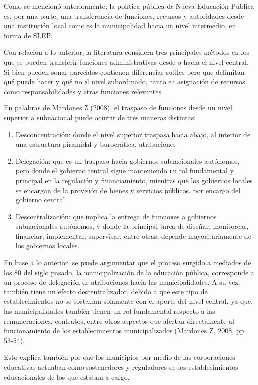 \documentclass[
  12pt,
  letterpaper,
]{article}
\begin{document}
Como se mencionó anteriormente, la política pública de Nueva Educación Pública es, por una parte, una transferencia de funciones, recursos y autoridades desde una institución local como es la municipalidad hacia un nivel intermedio, en forma de SLEP.

Con relación a lo anterior, la literatura considera tres principales métodos en los que se pueden transferir funciones administrativas desde o hacia el nivel central.
Si bien pueden sonar parecidos contienen diferencias sutiles pero que delimitan qué puede hacer y qué no el nivel subordinado, tanto en asignación de recursos como responsabilidades y otras funciones relevantes.

En palabras de Mardones Z (2008), el traspaso de funciones desde un nivel superior a subnacional puede ocurrir de tres maneras distintas:

\begin{enumerate}
\def\labelenumi{\arabic{enumi}.}
\item
  Desconcentración: donde el nivel superior traspasa hacia abajo, al interior de una estructura piramidal y burocrática, atribuciones
\item
  Delegación: que es un traspaso hacia gobiernos subnacionales autónomos, pero donde el gobierno central sigue manteniendo un rol fundamental y principal en la regulación y financiamiento, mientras que los gobiernos locales se encargan de la provisión de bienes y servicios públicos, por encargo del gobierno central
\item
  Descentralización: que implica la entrega de funciones a gobiernos subnacionales autónomos, y donde la principal tarea de diseñar, monitorear, financiar, implementar, supervisar, entre otras, depende mayoritariamente de los gobiernos locales.
\end{enumerate}

En base a lo anterior, se puede argumentar que el proceso surgido a mediados de los 80 del siglo pasado, la municipalización de la educación pública, corresponde a un proceso de delegación de atribuciones hacia las municipalidades.
A su vez, también tiene un efecto descentralizador, debido a que este tipo de establecimientos no se sostenían solamente con el aporte del nivel central, ya que, las municipalidades también tienen un rol fundamental respecto a las remuneraciones, contratos, entre otros aspectos que afectan directamente al funcionamiento de los establecimientos municipalizados (Mardones Z, 2008, pp. 53-54).

Esto explica también por qué los municipios por medio de las corporaciones educativas actuaban como sostenedores y reguladores de los establecimientos educacionales de los que estaban a cargo.
\end{document}
